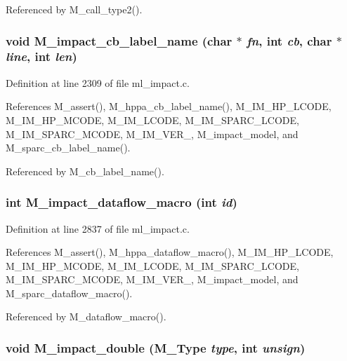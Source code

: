Referenced by M\_\-call\_\-type2().
\subsubsection{\setlength{\rightskip}{0pt plus 5cm}void M\_\-impact\_\-cb\_\-label\_\-name (char $\ast$ {\em fn}, int {\em cb}, char $\ast$ {\em line}, int {\em len})}\label{ml__impact_8c_842d345871ee8cabee91082195650597}




Definition at line 2309 of file ml\_\-impact.c.

References M\_\-assert(), M\_\-hppa\_\-cb\_\-label\_\-name(), M\_\-IM\_\-HP\_\-LCODE, M\_\-IM\_\-HP\_\-MCODE, M\_\-IM\_\-LCODE, M\_\-IM\_\-SPARC\_\-LCODE, M\_\-IM\_\-SPARC\_\-MCODE, M\_\-IM\_\-VER\_, M\_\-impact\_\-model, and M\_\-sparc\_\-cb\_\-label\_\-name().

Referenced by M\_\-cb\_\-label\_\-name().
\subsubsection{\setlength{\rightskip}{0pt plus 5cm}int M\_\-impact\_\-dataflow\_\-macro (int {\em id})}\label{ml__impact_8c_d1f56f35be1b1788e8ae85c69cc910d3}




Definition at line 2837 of file ml\_\-impact.c.

References M\_\-assert(), M\_\-hppa\_\-dataflow\_\-macro(), M\_\-IM\_\-HP\_\-LCODE, M\_\-IM\_\-HP\_\-MCODE, M\_\-IM\_\-LCODE, M\_\-IM\_\-SPARC\_\-LCODE, M\_\-IM\_\-SPARC\_\-MCODE, M\_\-IM\_\-VER\_, M\_\-impact\_\-model, and M\_\-sparc\_\-dataflow\_\-macro().

Referenced by M\_\-dataflow\_\-macro().
\subsubsection{\setlength{\rightskip}{0pt plus 5cm}void M\_\-impact\_\-double (\bf{M\_\-Type} {\em type}, int {\em unsign})}\label{ml__impact_8c_b04477a74ff1bd6c006864e0dc4cc493}




